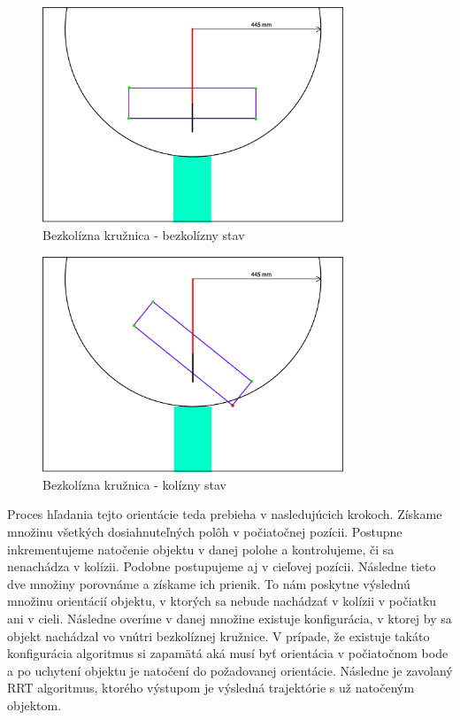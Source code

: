 \begin{figure}[h]
	\centering
	\includegraphics[width=90mm]{img/PREROT-kruznica2.pdf}
	\caption{ Bezkolízna kružnica - bezkolízny stav} \label{OBRAZOK 4.13} 
\end{figure} 

\begin{figure}[h]
	\centering
	\includegraphics[width=90mm]{img/PREROT-kruznica1.pdf}
	\caption{ Bezkolízna kružnica - kolízny stav} \label{OBRAZOK 4.14} 
\end{figure} 
Proces hľadania tejto orientácie teda prebieha v nasledujúcich krokoch. Získame množinu všetkých dosiahnuteľných polôh v počiatočnej pozícii. Postupne inkrementujeme natočenie objektu v danej polohe a kontrolujeme, či sa nenachádza v kolízii. Podobne postupujeme aj v cieľovej pozícii. Následne tieto dve množiny porovnáme a získame ich prienik. To nám poskytne výslednú množinu orientácií objektu, v ktorých sa nebude nachádzať v kolízii v počiatku ani v cieli. Následne overíme v danej množine existuje konfigurácia, v ktorej by sa objekt nachádzal vo vnútri bezkolíznej kružnice. V prípade, že existuje takáto konfigurácia algoritmus si zapamätá aká musí byť orientácia v počiatočnom bode a po uchytení objektu je natočení do požadovanej orientácie. Následne je zavolaný RRT algoritmus, ktorého výstupom je výsledná trajektórie s už natočeným objektom.

